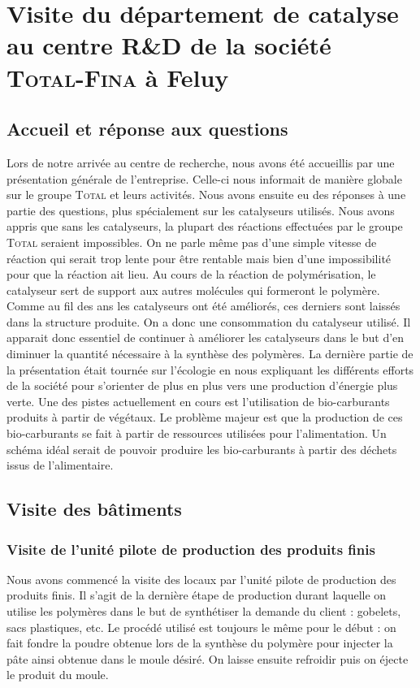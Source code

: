 \section{Visite du département de catalyse au centre R\&D de la société \textsc{Total-Fina} à Feluy}

\subsection{Accueil et réponse aux questions}
Lors de notre arrivée au centre de recherche, nous avons été accueillis par une présentation générale de l'entreprise. Celle-ci nous informait de manière globale sur le groupe \textsc{Total} et leurs activités.
Nous avons ensuite eu des réponses à une partie des questions, plus spécialement sur les catalyseurs utilisés. Nous avons appris que sans les catalyseurs, la plupart des réactions effectuées par le groupe \textsc{Total} seraient impossibles. On ne parle même pas d'une simple vitesse de réaction qui serait trop lente pour être rentable mais bien d'une impossibilité pour que la réaction ait lieu. Au cours de la réaction de polymérisation, le catalyseur sert de support aux autres molécules qui formeront le polymère. Comme au fil des ans les catalyseurs ont été améliorés, ces derniers sont laissés dans la structure produite. On a donc une consommation du catalyseur utilisé. Il apparait donc essentiel de continuer à améliorer les catalyseurs dans le but d'en diminuer la quantité nécessaire à la synthèse des polymères.
La dernière partie de la présentation était tournée sur l'écologie en nous expliquant les différents efforts de la société pour s'orienter de plus en plus vers une production d'énergie plus verte. Une des pistes actuellement en cours est l'utilisation de bio-carburants produits à partir de végétaux. Le problème majeur est que la production de ces bio-carburants se fait à partir de ressources utilisées pour l'alimentation. Un schéma idéal serait de pouvoir produire les bio-carburants à partir des déchets issus de l'alimentaire.

\subsection{Visite des bâtiments}

\subsubsection{Visite de l'unité pilote de production des produits finis}
Nous avons commencé la visite des locaux par l'unité pilote de production des produits finis. Il s'agit de la dernière étape de production durant laquelle on utilise les polymères dans le but de synthétiser la demande du client : gobelets, sacs plastiques, etc. Le procédé utilisé est toujours le même pour le début : on fait fondre la poudre obtenue lors de la synthèse du polymère pour injecter la pâte ainsi obtenue dans le moule désiré. On laisse ensuite refroidir puis on éjecte le produit du moule.

